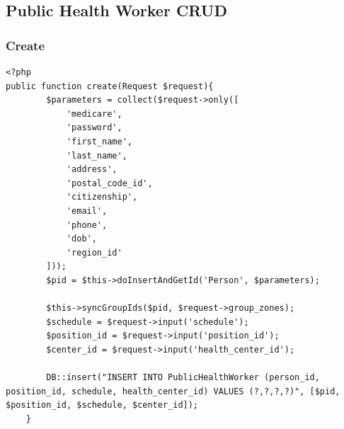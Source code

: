 \documentclass{article}
\begin{document}
\subsection{Public Health Worker CRUD}
\subsubsection{Create}
\begin{verbatim}
<?php
public function create(Request $request){
        $parameters = collect($request->only([
            'medicare',
            'password',
            'first_name',
            'last_name',
            'address',
            'postal_code_id',
            'citizenship',
            'email',
            'phone',
            'dob',
            'region_id'
        ]));
        $pid = $this->doInsertAndGetId('Person', $parameters);

        $this->syncGroupIds($pid, $request->group_zones);
        $schedule = $request->input('schedule');
        $position_id = $request->input('position_id');
        $center_id = $request->input('health_center_id');

        DB::insert("INSERT INTO PublicHealthWorker (person_id, position_id, schedule, health_center_id) VALUES (?,?,?,?)", [$pid, $position_id, $schedule, $center_id]);
    }
\end{verbatim}
\end{document}
